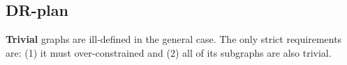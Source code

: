 \subsection{DR-plan}
%
%
%
%
%
%
%
%
%
%
\textbf{Trivial} graphs are ill-defined in the general case. The only strict requirements are: (1) it must over-constrained and (2) all of its subgraphs are also trivial.

